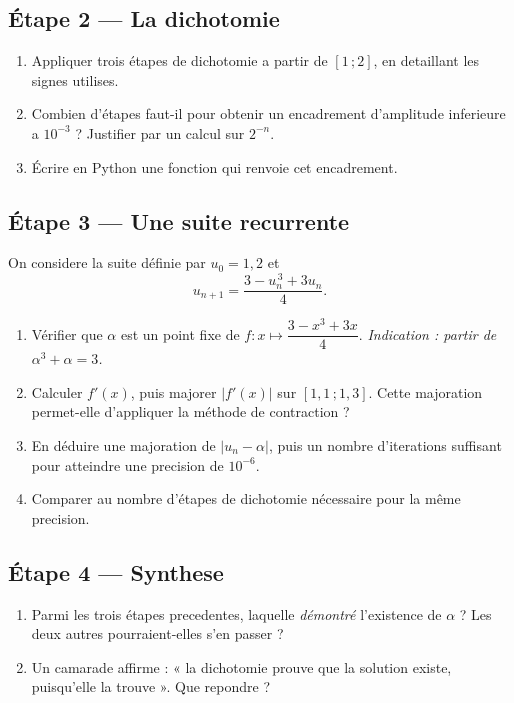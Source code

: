 \subsection*{Étape 2 — La dichotomie}

\begin{enumerate}
  \item Appliquer trois étapes de dichotomie a partir de $[1\,;2]$, en detaillant
  les signes utilises.
  \item Combien d'étapes faut-il pour obtenir un encadrement d'amplitude
  inferieure a $10^{-3}$ ? Justifier par un calcul sur $2^{-n}$.
  \item Écrire en Python une fonction qui renvoie cet encadrement.
\end{enumerate}

\subsection*{Étape 3 — Une suite recurrente}

On considere la suite définie par $u_0 = 1{,}2$ et
\[ u_{n+1} = \frac{3 - u_n^{\,3} + 3u_n}{4}. \]

\begin{enumerate}
  \item Vérifier que $\alpha$ est un point fixe de $f : x \mapsto \dfrac{3 - x^3 + 3x}{4}$.
  \emph{Indication : partir de $\alpha^3 + \alpha = 3$.}
  \item Calculer $f'(x)$, puis majorer $\left|f'(x)\right|$ sur $[1{,}1\,;1{,}3]$.
  Cette majoration permet-elle d'appliquer la méthode de contraction ?
  \item En déduire une majoration de $\left|u_n - \alpha\right|$, puis un nombre
  d'iterations suffisant pour atteindre une precision de $10^{-6}$.
  \item Comparer au nombre d'étapes de dichotomie nécessaire pour la même precision.
\end{enumerate}

\subsection*{Étape 4 — Synthese}

\begin{enumerate}
  \item Parmi les trois étapes precedentes, laquelle \emph{démontré} l'existence
  de $\alpha$ ? Les deux autres pourraient-elles s'en passer ?
  \item Un camarade affirme : « la dichotomie prouve que la solution existe,
  puisqu'elle la trouve ». Que repondre ?
\end{enumerate}

